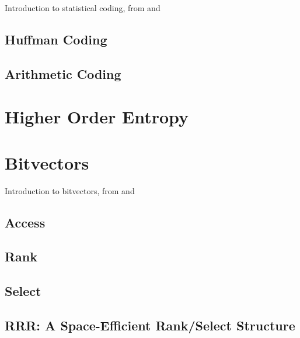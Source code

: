 Introduction to statistical coding, from \cite{han2002mathematics} and \cite{ferragina2023pearls}

\subsection{Huffman Coding}

\subsection{Arithmetic Coding}

\section{Higher Order Entropy}

\section{Bitvectors}

Introduction to bitvectors, from \cite{ferragina2023pearls} and \cite{navarro2016compact}

\subsection{Access}
\subsection{Rank}
\subsection{Select}
\subsection{RRR: A Space-Efficient Rank/Select Structure}
